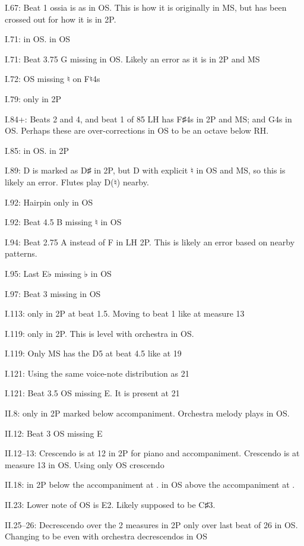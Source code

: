 \documentclass[twoside]{article}
\newcommand\dynmark[1]{\scalebox{0.9}{#1}{\kern1pt}}
\begin{document}
\begin{hangparas}{15pt}{1}
\begin{multicols}{2}
I.67: Beat 1 ossia is as in OS. This is how it is originally in MS, but has been crossed out for how it is in 2P.

I.71: \dynmark{\p} in OS. \dynmark{\pp} in OS

I.71: Beat 3.75 G missing in OS. Likely an error as it is in 2P and MS

I.72: OS missing ♮ on F♮4s

I.79: \dynmark{\pp} only in 2P

I.84+: Beats 2 and 4, and beat 1 of 85 LH has F♯4s in 2P and MS; and G4s in OS. Perhaps these are over-corrections in OS to be an octave below RH.

I.85: \dynmark{\pp} in OS. \dynmark{\p} in 2P

I.89: D is marked as D♯ in 2P, but D with explicit ♮ in OS and MS, so this is likely an error. Flutes play D(♮) nearby.

I.92: Hairpin only in OS

I.92: Beat 4.5 B missing ♮ in OS

I.94: Beat 2.75 A instead of F in LH 2P. This is likely an error based on nearby patterns.

I.95: Last E♭ missing ♭ in OS

I.97: Beat 3 missing in OS

I.113: \dynmark{\f} only in 2P at beat 1.5. Moving to beat 1 like at measure 13

I.119: \dynmark{\ff} only in 2P. This is level with orchestra in OS.

I.119: Only MS has the D5 at beat 4.5 like at 19

I.121: Using the same voice-note distribution as 21

I.121: Beat 3.5 OS missing E. It is present at 21

II.8: \dynmark{\mf} only in 2P marked below \dynmark{\f} accompaniment. Orchestra melody plays \dynmark{\mezzopiano} in OS.

II.12: Beat 3 OS missing E

II.12--13: Crescendo is at 12 in 2P for piano and accompaniment. Crescendo is at measure 13 in OS. Using only OS crescendo

II.18: \dynmark{\f} in 2P below the accompaniment at \dynmark{\ff}. \dynmark{\ff} in OS above the accompaniment at \dynmark{\f}.

II.23: Lower note of OS is E2. Likely supposed to be C♯3.

II.25--26: Decrescendo over the 2 measures in 2P only over last beat of 26 in OS. Changing to be even with orchestra decrescendos in OS


\end{multicols}
\end{hangparas}
\end{document}
